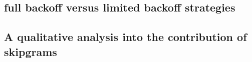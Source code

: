 \subsection{\textsf{full} backoff versus \textsf{lim}ited backoff strategies}

\subsection{A qualitative analysis into the contribution of skipgrams}

%
%
